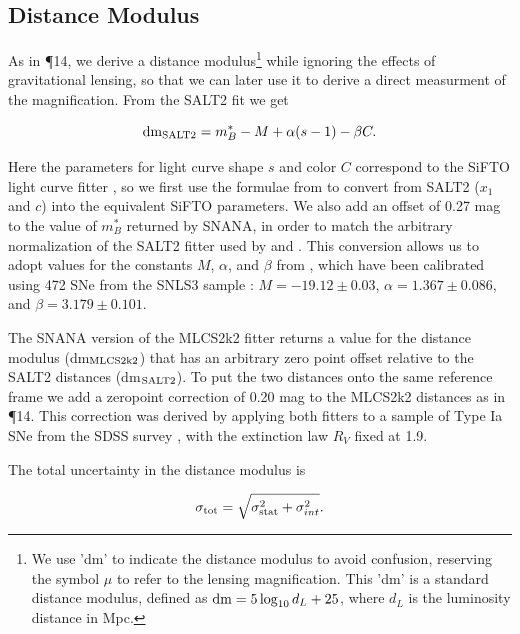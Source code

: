 \subsection{Distance Modulus}
\label{sec:DistanceModulus}

As in \P14, we derive a distance modulus\footnote{We use 'dm' to
indicate the distance modulus to avoid confusion, reserving the symbol
$\mu$ to refer to the lensing magnification. This 'dm' is a standard
distance modulus, defined as ${\rm dm}=5\log_{10}d_L+25$, where $d_L$
is the luminosity distance in Mpc.} while ignoring the
effects of gravitational lensing, so that we can later use it to
derive a direct measurment of the magnification.  From the SALT2 fit
we get

\begin{equation} \label{eqn:dmSALT2}
 {\rm dm}_{\rm SALT2} = m_B^* - M + \alpha(s-1) - \beta C.
\end{equation}

\noindent  Here the parameters for light curve shape $s$ and color $C$ 
correspond to the SiFTO light curve fitter \citep{Conley:2008}, so we
first use the formulae from \citet{Guy:2010} to convert from SALT2
($x_1$ and $c$) into the equivalent SiFTO parameters.  We also add an
offset of 0.27 mag to the value of $m_B^*$ returned by SNANA, in order
to match the arbitrary normalization of the SALT2 fitter used
by \citet{Guy:2010} and \citet{Sullivan:2011}.  This conversion allows
us to adopt values for the constants $M$, $\alpha$, and $\beta$
from \citet{Sullivan:2011}, which have been calibrated using 472 SNe
from the SNLS3 sample \citep{Conley:2011}: $M=-19.12\pm0.03$,
$\alpha=1.367\pm0.086$, and $\beta=3.179\pm0.101$.



The SNANA version of the MLCS2k2 fitter returns a value for the
distance modulus (dm$_{\rm MLCS2k2}$) that has an arbitrary zero point
offset relative to the SALT2 distances (dm$_{\rm SALT2}$).  To put the
two distances onto the same reference frame we add a zeropoint
correction of 0.20 mag to the MLCS2k2 distances as
in \P14.  This correction was derived by applying both
fitters to a sample of Type Ia SNe from the SDSS
survey \citep{Holtzman:2008,Kessler:2009b}, with the extinction law
$R_V$ fixed at 1.9.


The total uncertainty in the distance modulus is  

\begin{equation} \label{eqn:sigmatot}
 \sigma_{\rm tot} = \sqrt{ \sigma_{\rm stat}^2 + \sigma_{int}^2}.
\end{equation}

